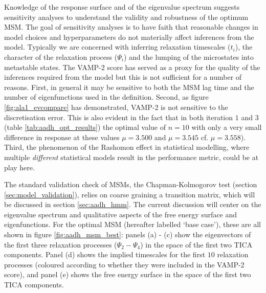 Knowledge of the response surface and of the eigenvalue spectrum suggests sensitivity analyses to understand the validity and robustness of the optimum MSM.  The goal of sensitivity analyses is to have faith that reasonable changes in model choices and hyperparameters do not materially affect inferences from the model. Typically we are concerned with inferring relaxation timescales ($t_{i}$), the character of the relaxation process ($\Psi_{i}$) and the lumping of the microstates into metastable states. The VAMP-2 score has served as a proxy for the quality of the inferences required from the model but this is not sufficient  for a number of reasons.  First, in general it may be sensitive to both the MSM lag time and the number of eigenfunctions used in the definition. Second, as figure \ref{fig:ala1_evcompare} has demonstrated, VAMP-2 is not sensitive to the discretisation error. This is also evident in the fact that in both iteration $1$ and $3$ (table \ref{tab:aadh_opt_results}) the optimal value of $n=10$ with only a very small difference in response at these values $\mu = 3.500$ and   $\mu=3.545$ cf. $\mu=3.558$). Third, the phenomenon of the Rashomon effect \cite{breiman2001} in statistical modelling, where  multiple \emph{different} statistical models result in the performance metric, could be at play here.

The standard validation check of MSMs, the Chapman-Kolmogorov test (section \ref{sec:model_validation}), relies on coarse graining a transition matrix, which will be discussed in section \ref{sec:aadh_hmm}. The current discussion will center on the eigenvalue spectrum and qualitative aspects of the free energy surface and eigenfunctions. For the optimal MSM (hereafter labelled `base case'), these are all shown in figure \ref{fig:aadh_msm_best}: panels (a) - (c) show the eigenvectors of the first three relaxation processes ($\Psi_{2} - \Psi_{4}$) in the space of the first two TICA components. Panel (d) shows the implied timescales for the first $10$ relaxation processes (coloured according to whether they were included in the VAMP-2 score), and panel (e) shows the free energy surface in the space of the first two TICA components.

